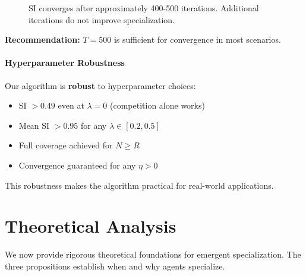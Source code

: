 \documentclass[11pt,a4paper]{article}
\theoremstyle{definition}
\theoremstyle{plain}
\begin{document}
\begin{figure}[h]
\centering
{}
\caption{SI converges after approximately 400-500 iterations. Additional iterations do not improve specialization.}
\end{figure}

\textbf{Recommendation:} $T = 500$ is sufficient for convergence in most scenarios.

\subsection{Hyperparameter Robustness}

\begin{keypoint}
Our algorithm is \textbf{robust} to hyperparameter choices:
\begin{itemize}
    \item SI $> 0.49$ even at $\lambda = 0$ (competition alone works)
    \item Mean SI $> 0.95$ for any $\lambda \in [0.2, 0.5]$
    \item Full coverage achieved for $N \geq R$
    \item Convergence guaranteed for any $\eta > 0$
\end{itemize}
This robustness makes the algorithm practical for real-world applications.
\end{keypoint}

\newpage
\part{Theoretical Analysis}

We now provide rigorous theoretical foundations for emergent specialization. The three propositions establish when and why agents specialize.
\end{document}
